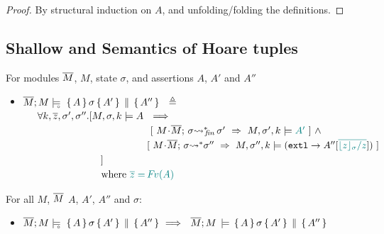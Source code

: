 {\begin{proof}
By structural induction on $A$, and unfolding/folding the definitions.
\end{proof}




\subsection{Shallow and \Scoped Semantics of Hoare tuples}

\begin{definition}
\label{def:restrict}
For modules $\overline{M}$, $M$, state $\sigma$,  
and assertions $A$, $A'$ and  $A''$
\begin{itemize}
\item
$ {\overline{M};M \models\!\!\!\!_{_{\circ}}\  \, \{\, A\,\}\, \sigma\, \{\, A'\,\} \,\parallel\, \{\, A''\,\}  } \ \ \triangleq \ \ $  \\
$\strut \hspace{.5cm} \forall k, \overline{z}, \sigma',\sigma''.[
  M,\sigma ,{k} \models {A}   \  
  \ \Longrightarrow$\\
$\strut \hspace{4.5cm}    [ \ {\leadstoBoundedStarFin {M\madd \Mtwo}{\sigma}  {\sigma'} }\  \Rightarrow \    \satDAssertFrom M  {\sigma'} k   {\sdN{A'}}   \ ]
 \ \wedge$\\
$\strut \hspace{4.5cm}    [ \ {\leadstoBoundedStar  {M\madd \Mtwo}{\sigma}  {\sigma''} }\  \Rightarrow\      \satDAssertFrom M  {\sigma''}  k  {(\externalexec \rightarrow A''[\sdN{\overline{\interpret \sigma z/z}}])} \ ] $\\
$\strut \hspace{2.3cm}\ \ \ \ ]  $ \\
$\strut \hspace{2.3cm}\ \ \ \  \mbox{where }  {\color{teal}{ \overline z= {\hspace{-1pt}F\hspace{-1pt}}v(A)}}$ %
\end{itemize}
\end{definition}



 
\begin{lemma} 
For all $M$, $\overline{M}$ $A$, $A'$, $A''$ and $\sigma$:
\begin{itemize}
\item
$ {\overline{M};M \models\!\!\!\!_{_{\circ}}\  \, \{\, A\,\}\, \sigma\, \{\, A'\,\} \,\parallel\, \{\, A''\,\}  } \ \Longrightarrow \ \
  {\overline{M}; M\, \models \, \{\, A\,\}\, \sigma \, \{\, A'\,\} \,\parallel\, \{\, A''\,\}  } $
\end{itemize}
\end{lemma}

}
